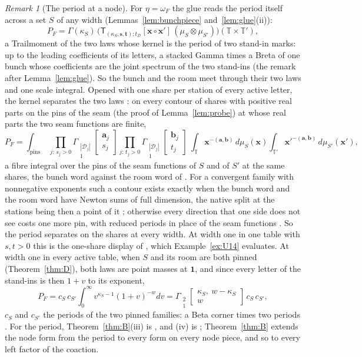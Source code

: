 \documentclass[11pt]{article}
\theoremstyle{plain}
\theoremstyle{definition}
\theoremstyle{remark}
\newtheorem{rem}[prop]{Remark}
\newcommand{\cD}{\mathcal D}
\newcommand{\TT}{\mathbb T}
\newcommand{\bx}{\mathbf x}
\newcommand{\sT}{\mathsf T}
\newcommand{\Gst}[4]{\Gamma_{\substack{#1\\#2}}\!\begin{bmatrix}#3\\#4\end{bmatrix}}
\begin{document}
\begin{rem}[The period at a node]\label{rem:periodnode}
For $\eta=\omega_F$ the glue reads the period itself across a set $S$ of any width (Lemmas~\ref{lem:bunchpiece} and~\ref{lem:glue}(ii)):
\[
P_F=\Gamma(\kappa_S)\,\big(\sT_{(\kappa_S,\mathbf s,\mathbf t);t_{\cD}}[\bx\circ\bx']\,(\mu_S\otimes\mu_{S'})\big)(\TT\times\TT'),
\]
a Trailmoment of the two laws whose kernel is the period of two stand-in marks: up to the leading coefficients of its letters, a stacked Gamma times a Breta of one bunch whose coefficients are the joint spectrum of the two stand-ins (the remark after Lemma~\ref{lem:glue}). So the bunch and the room meet through their two laws and one scale integral. Opened with one share per station of every active letter, the kernel separates the two laws \cite[Thm.~27.9(iii), p.~230]{F}: on every contour of shares with positive real parts on the pins of the seam (the proof of Lemma~\ref{lem:probe}) at whose real parts the two seam functions are finite,
\[
P_F=\int_{\text{pins}}\ \prod_{j:\,s_j>0}\Gst{|\cD_j|}1{\mathbf a_j}{s_j}\prod_{j:\,t_j>0}\Gst{|\cD_j|}1{\mathbf b_j}{t_j}\ \int_{\TT}\bx^{-(\mathbf a,\mathbf b)}\,d\mu_S(\bx)\int_{\TT'}\bx'^{-(\mathbf a,\mathbf b)}\,d\mu_{S'}(\bx'),
\]
a fibre integral over the pins \cite[Def.~4.1, p.~25]{F} of the seam functions of $S$ and of $S'$ at the same shares, the bunch word against the room word of \cite[Thm.~21.13, p.~178]{F}. For a convergent family with nonnegative exponents such a contour exists exactly when the bunch word and the room word have Newton sums of full dimension, the native split at the stations being then a point of it \cite[Thm.~24.12, p.~204; Lemma~28.8, p.~244]{F}; otherwise every direction that one side does not see costs one more pin, with reduced periods in place of the seam functions \cite[Thm.~27.11, p.~232]{F}. So the period separates on the shares at every width. At width one in one table with $s,t>0$ this is the one-share display of \cite[Thm.~18.13, p.~119]{F}, which Example~\ref{ex:U14} evaluates. At width one in every active table, when $S$ and its room are both pinned (Theorem~\ref{thm:D}), both laws are point masses at $\mathbf 1$, and since every letter of the stand-ins is then $1+v$ to its exponent,
\[
P_F=c_S\,c_{S'}\int_0^\infty v^{\kappa_S-1}(1+v)^{-w}dv=\Gst21{\kappa_S,\ w-\kappa_S}{w}\,c_S\,c_{S'},
\]
$c_S$ and $c_{S'}$ the periods of the two pinned families: a Beta corner times two periods \cite[Cor.~18.14, p.~121]{F}. For the period, Theorem~\ref{thm:B}(iii) is \cite[Thm.~15.2, p.~87; Cor.~15.7, p.~89]{F}, and (iv) is \cite[Thm.~18.13, p.~119]{F}; Theorem~\ref{thm:B} extends the node form from the period to every form on every node piece, and so to every left factor of the coaction.
\end{rem}
\end{document}
